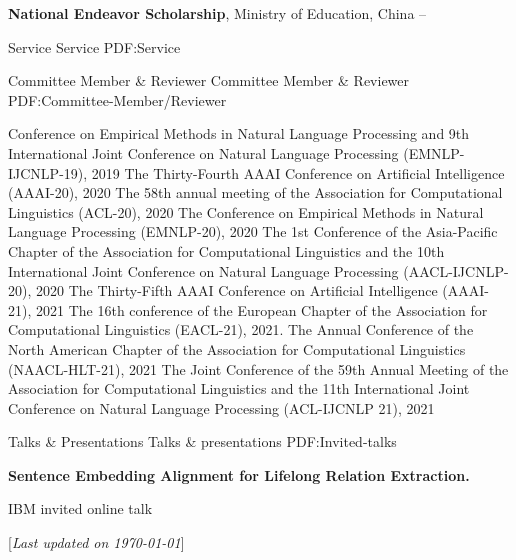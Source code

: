 \documentclass[letterpaper,MMMyyyy,nonstopmode]{simpleresumecv}
\newcommand{\CVNote}{Last updated on {\today}}
\begin{document}
\begin{Body}
\Gap
\Entry
\textbf{National Endeavor Scholarship}, Ministry of Education, China
\hfill
{} -- 

\Section
{Service}
{Service}
{PDF:Service}

\SubSection
{Committee Member \& Reviewer}
{Committee Member \& Reviewer}
{PDF:Committee-Member/Reviewer}

    \BulletItem Conference on Empirical Methods in Natural Language Processing and 9th International Joint Conference on Natural Language Processing (EMNLP-IJCNLP-19), 2019
    \BulletItem The Thirty-Fourth AAAI Conference on Artificial Intelligence (AAAI-20), 2020
    \BulletItem The 58th annual meeting of the Association for Computational Linguistics (ACL-20), 2020
    \BulletItem The Conference on Empirical Methods in Natural Language Processing (EMNLP-20), 2020
    \BulletItem The 1st Conference of the Asia-Pacific Chapter of the Association for Computational Linguistics and the 10th International Joint Conference on Natural Language Processing (AACL-IJCNLP-20), 2020
    \BulletItem The Thirty-Fifth AAAI Conference on Artificial Intelligence (AAAI-21), 2021
    \BulletItem The 16th conference of the European Chapter of the Association for Computational Linguistics (EACL-21), 2021. 
    \BulletItem The Annual Conference of the North American Chapter of the Association for Computational Linguistics (NAACL-HLT-21), 2021
    \BulletItem The Joint Conference of the 59th Annual Meeting of the Association for Computational Linguistics and the 11th International Joint Conference on Natural Language Processing (ACL-IJCNLP 21), 2021

\Section
{Talks \& \newline Presentations}
{Talks \& presentations}
{PDF:Invited-talks}

\Entry \textbf{Sentence Embedding Alignment for Lifelong Relation Extraction.} \hfill {}
\begin{Detail}
\BulletItem
IBM invited online talk
\end{Detail}


\end{Body}


\UseNoteFont%
\null\hfill%
[\textit{\CVNote}]
\end{document}
